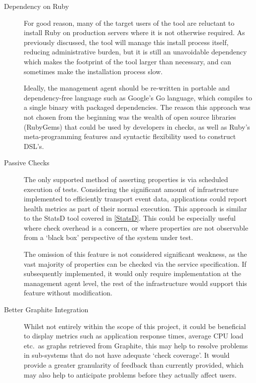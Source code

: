 \documentclass{cshonours}
\begin{document}
\begin{description}
  \item[Dependency on Ruby] For good reason, many of the target users of the tool are reluctant to install Ruby on production servers where it is not otherwise required. As previously discussed, the tool will manage this install process itself, reducing administrative burden, but it is still an unavoidable dependency which makes the footprint of the tool larger than necessary, and can sometimes make the installation process slow.

    Ideally, the management agent should be re-written in portable and dependency-free language such as Google's Go language, which compiles to a single binary with packaged dependencies. The reason this approach was not chosen from the beginning was the wealth of open source libraries (RubyGems) that could be used by developers in checks, as well as Ruby's meta-programming features and syntactic flexibility used to construct DSL's.

  \item[Passive Checks] The only supported method of asserting properties is via scheduled execution of tests. Considering the significant amount of infrastructure implemented to efficiently transport event data, applications could report health metrics as part of their normal execution. This approach is similar to the StatsD tool covered in \autoref{StatsD}. This could be especially useful where check overhead is a concern, or where properties are not observable from a `black box' perspective of the system under test.

    The omission of this feature is not considered significant weakness, as the vast majority of properties can be checked via the service specification. If subsequently implemented, it would only require implementation at the management agent level, the rest of the infrastructure would support this feature without modification.

  \item[Better Graphite Integration] Whilst not entirely within the scope of this project, it could be beneficial to display metrics such as application response times, average CPU load etc.\ as graphs retrieved from Graphite, this may help to resolve problems in sub-systems that do not have adequate `check coverage'. It would provide a greater granularity of feedback than currently provided, which may also help to anticipate problems before they actually affect users.
\end{description}
\end{document}
